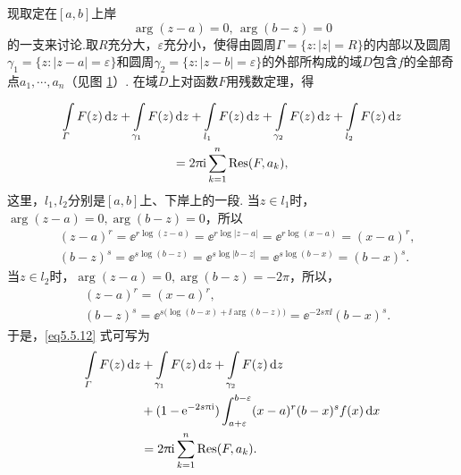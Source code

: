 现取定在$[a,b]$上岸
\[\arg(z-a)=0,\,\arg(b-z)=0\]
的一支来讨论.取$R$充分大，$\varepsilon$充分小，使得由圆周$\Gamma=\{z:|z|=R\}$的内部以及圆周
$\gamma_1=\{z:|z-a|=\varepsilon\}$和圆周$\gamma_2=\{z:|z-b|=\varepsilon\}$的外部所构成的域$D$包含$f$的全部奇点$a_1,\cdots,a_n$（见图 \ref{fig5.6}）. 在域$D$上对函数$F$用残数定理，得
\begin{figure}[!ht]
\centering
{}
\caption{\label{fig5.6}}
\end{figure}
\begin{equation}\label{eq5.5.12}
\begin{gathered}
\int\limits_\varGamma F(z)\mathop{}\!\mathrm dz+\int\limits_{\gamma_1}F(z)\mathop{}\!\mathrm dz+\int\limits_{l_1}F(z)\mathop{}\!\mathrm dz
+\int\limits_{\gamma_2}F(z)\mathop{}\!\mathrm dz+\int\limits_{l_2}F(z)\mathop{}\!\mathrm dz\\
=2\uppi\mathrm i\sum_{k=1}^n\operatorname*{Res}(F,a_k),
\end{gathered}
\end{equation}
这里，$l_1,l_2$分别是$[a,b]$上、下岸上的一段. 当$z\in l_1$时，$\arg(z-a)=0,\arg(b-z)=0$，所以
\begin{align*}
&(z-a)^r=\ee^{r\log(z-a)}=\ee^{r\log|z-a|}=\ee^{r\log(x-a)}=(x-a)^r,\\
&(b-z)^s=\ee^{s\log(b-z)}=\ee^{s\log|b-z|}=\ee^{s\log(b-x)}=(b-x)^s.
\end{align*}
当$z\in l_2$时，$\arg(z-a)=0,\arg(b-z)=-2\pi$，所以，
\begin{align*}
&(z-a)^r=(x-a)^r,\\
&(b-z)^s=\ee^{s\big(\log(b-x)+\ii\arg(b-z)\big)}=\ee^{-2s\pi\ii}(b-x)^s.
\end{align*}
于是，\eqref{eq5.5.12} 式可写为
\begin{equation}\label{eq5.5.13}
\begin{aligned}
\int\limits_\varGamma F(z)\mathop{}\!\mathrm dz&+\int\limits_{\gamma_1}F(z)\mathop{}\!\mathrm dz+\int\limits_{\gamma_2}F(z)\mathop{}\!\mathrm dz\\
&+(1-\operatorname{\!\!\;\mathrm e}^{-2s\uppi\mathrm i})\int_{a+\varepsilon}^{b-\varepsilon}(x-a)^r(b-x)^sf(x)\mathop{}\!\mathrm dx\\
&=2\uppi\mathrm i\sum_{k=1}^n\operatorname*{Res}(F,a_k).
\end{aligned}
\end{equation}
